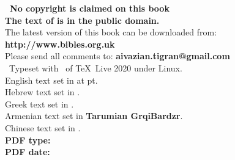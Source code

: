 \titleframe

\newpage


\begin{center}
\begin{center}\end{center}
\infofontsize
\parbox{0.9\linewidth}{\centering
\textbf{\upshape\nocopyright\ No copyright is claimed on this book\\
The text of  is in the public domain.}\\[5pt]
The latest version of this book can be downloaded from:\\
{\upshape\bfseries http://www.bibles.org.uk}\\
Please send all comments to: {\makeatletter\upshape\bfseries aivazian.tigran@gmail.com\makeatother}\\[1ex]
\tux\ Typeset with \XeLaTeX\ of \TeX\ Live 2020 under Linux.\\
English text set in {\bfseries{}\urantiamainfont{}} at \urantiamainfontsize pt.\\
Hebrew text set in \textbf{\hebrewfontname}.\\
Greek text set in \textbf{\greekfontname}.\\
Armenian text set in \textbf{Tarumian GrqiBardzr}.\\
Chinese text set in \textbf{\chinesefontname}.\\[10pt]
\upshape\bfseries
PDF type: \pdftype\\
PDF date: \mytoday{}\\
}
\end{center}

\titleframe
